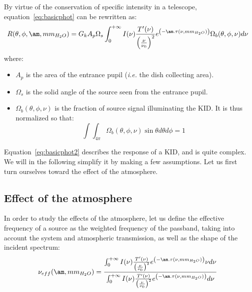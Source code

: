 By virtue of the conservation of specific intensity in a telescope,
equation~\ref{eq:basicphot} can be rewritten as:
\begin{equation}
R(\theta, \phi, \am, mm_{H_{2}O}) = G_{k} A_{p}\Omega_{s}\int_{0}^{+\infty} I(\nu)
\frac{T'(\nu)}{\left(\frac{\nu}{\nu_{0}}\right)^{2}} e^{\left(-\am
  . \tau(\nu,  mm_{H_{2}O})\right)} \Omega_{b} (\theta, \phi, \nu)  d\nu 
\label{eq:basicphot2}
\end{equation}
where:
\begin{itemize}
\item $A_{p}$ is the area of the entrance pupil ({\it i.e.} the
  dish collecting area).
\item $\Omega_{s}$ is the solid angle of the source seen from the
  entrance pupil.
\item $\Omega_{b}(\theta, \phi, \nu)$ is the fraction of source signal
  illuminating the KID. It is thus normalized so that:
\begin{equation}
\int\int_{4\pi} \Omega_{b}(\theta, \phi, \nu) \sin \theta d\theta
d\phi = 1 
\label{eq:omegabdef}
\end{equation}
\end{itemize}

Equation~\ref{eq:basicphot2} describes the response of a KID, and  
is quite complex. We will in the following simplify it by making a few
assumptions. Let us first turn ourselves toward the effect of the
atmosphere. 


\subsection{Effect of the atmosphere}

In order to study the effects of the atmosphere, let us define the
effective frequency of a source as the weighted frequency of the
passband, taking into account the system and atmospheric transmission,
as well as the shape of the incident spectrum:
\begin{equation}
\nu_{eff}( \am, mm_{H_{2}O}) = \frac{ \int_{0}^{+\infty} I(\nu) \frac{T'(\nu)}{\left(\frac{\nu}{\nu_{0}}\right)^{2}} e^{\left(-\am
  . \tau(\nu,  mm_{H_{2}O})\right)} \nu d\nu } { \int_{0}^{+\infty} I(\nu) \frac{T'(\nu)}{\left(\frac{\nu}{\nu_{0}}\right)^{2}} e^{\left(-\am
  . \tau(\nu,  mm_{H_{2}O})\right)}  d\nu}
\label{eq:nueff}
\end{equation}


\\



